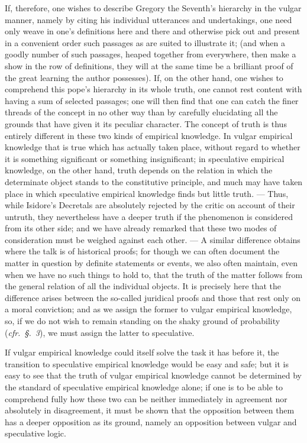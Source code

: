 \documentclass[12pt]{book}
\newcommand{\opage}[1]{\marginnote{\footnotesize\textit{[#1]}}}
\begin{document}
If, therefore, one wishes to describe Gregory the Seventh's hierarchy in the
vulgar manner, namely by citing his individual utterances and undertakings, one
need only weave in one's definitions here and there and otherwise pick out and
present in a convenient order such passages as are suited to illustrate it;
(and when a goodly number of such passages, heaped together from everywhere,
then make a show in the row of definitions, they will at the same time be a
brilliant proof of the great learning the author possesses). If, on the other
hand, one wishes to comprehend this pope's hierarchy in its whole truth, one
cannot rest content with having a sum of selected passages; one will then find
that one can catch the finer threads of the concept in no other way than by
carefully elucidating all the grounds that have given it its peculiar
character. The concept of truth is thus entirely different in these two kinds of
empirical knowledge. In vulgar empirical knowledge that is true which has
actually taken place, without regard to whether it is something significant or
something insignificant; in speculative empirical knowledge, on the other hand,
truth depends
\opage{27} on the relation in which the determinate object stands to the constitutive
principle, and much may have taken place in which speculative empirical
knowledge finds but little truth. --- Thus, while Isidore's Decretals are
absolutely rejected by the critic on account of their untruth, they nevertheless
have a deeper truth if the phenomenon is considered from its other side; and we
have already remarked that these two modes of consideration must be weighed
against each other. --- A similar difference obtains where the talk is of
historical proofs; for though we can often document the matter in question by
definite statements or events, we also often maintain, even when we have no
such things to hold to, that the truth of the matter follows from the general
relation of all the individual objects. It is precisely here that the
difference arises between the so-called juridical proofs and those that rest
only on a moral conviction; and as we assign the former to vulgar empirical
knowledge, so, if we do not wish to remain standing on the shaky ground of
probability (\textit{cfr.~§.~3}), we must assign the latter to speculative.

If vulgar empirical knowledge could itself solve the task it has before it, the
transition to speculative empirical knowledge would be easy and safe; but it is
easy to see that the truth of vulgar empirical knowledge cannot be determined by
the standard of speculative empirical knowledge alone; if one is to be able to
comprehend fully how these two can be neither immediately in agreement nor
absolutely in disagreement, it must be shown that the opposition between them
has a deeper opposition as its ground, namely an opposition between vulgar and
speculative logic.
\end{document}
